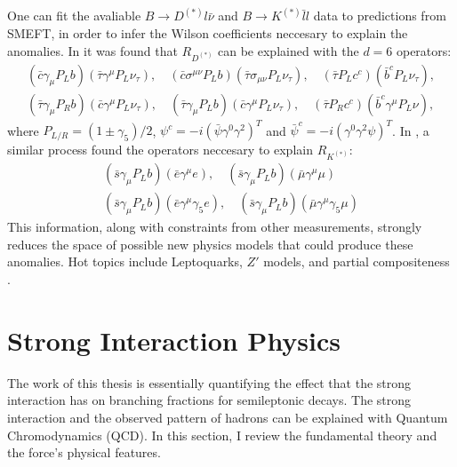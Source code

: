 One can fit the avaliable $B\to D^{(*)}l\bar{\nu}$ and $B\to K^{(*)}\bar{l}l$ data to predictions from SMEFT, in order to infer the Wilson coefficients neccesary to explain the anomalies. In \cite{Freytsis:2015qca} it was found that $R_{D^{(*)}}$ can be explained with the $d=6$ operators:
\begin{gather}
  \nonumber
  (\bar{c}\gamma_{\mu}P_L b)(\bar{\tau}\gamma^{\mu} P_L \nu_{\tau}), \quad
  (\bar{c}\sigma^{\mu\nu} P_L b)(\bar{\tau} \sigma_{\mu\nu} P_L \nu_{\tau}), \quad
  (\bar{\tau} P_L c^c)(\bar{b}^c P_L \nu_{\tau}), \\
  (\bar{\tau}\gamma_{\mu} P_R b) (\bar{c} \gamma^{\mu} P_L \nu_{\tau}), \quad
  (\bar{\tau}\gamma_{\mu}P_L b)(\bar{c}\gamma^{\mu} P_L \nu_{\tau}), \quad
  (\bar{\tau}P_R c^c)(\bar{b}^c \gamma^{\mu} P_L \nu),
\end{gather}
where $P_{L/R} = (1\pm \gamma_5)/2$, $\psi^c = -i(\bar{\psi}\gamma^0\gamma^2)^T$ and $\bar{\psi}^c = -i(\gamma^0\gamma^2 \psi)^T$. In \cite{Altmannshofer:2017yso}, a similar process found the operators neccesary to explain $R_{K^{(*)}}$:
\begin{gather}
  \nonumber
  (\bar{s}\gamma_{\mu}P_L b)(\bar{e}\gamma^{\mu}e), \quad (\bar{s}\gamma_{\mu}P_L b)(\bar{\mu}\gamma^{\mu}\mu) \\
  (\bar{s}\gamma_{\mu}P_L b)(\bar{e}\gamma^{\mu}\gamma_5e), \quad (\bar{s}\gamma_{\mu}P_L b)(\bar{\mu}\gamma^{\mu}\gamma_5\mu)
\end{gather}
This information, along with constraints from other measurements, strongly reduces the space of possible new physics models that could produce these anomalies. Hot topics include Leptoquarks, $Z'$ models, and partial compositeness \cite{Altmannshofer:2017yso,Freytsis:2015qca,Bauer:2015knc,Crivellin:2015mga}.




\section{Strong Interaction Physics}
\label{sec:stronginteractions}

The work of this thesis is essentially quantifying the effect that the strong interaction has on branching fractions for semileptonic decays. The strong interaction and the observed pattern of hadrons can be explained with Quantum Chromodynamics (QCD). In this section, I review the fundamental theory and the force's physical features.

